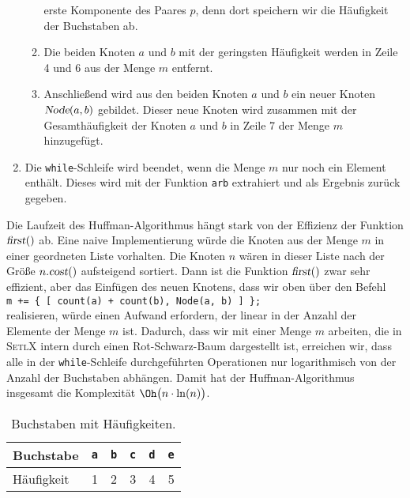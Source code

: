 \begin{enumerate}
\begin{enumerate}
            erste Komponente des Paares $p$, denn dort speichern wir die H\"aufigkeit der Buchstaben 
            ab.
      \item Die beiden Knoten $a$ und $b$ mit der geringsten H\"aufigkeit werden in Zeile 4 und 6
            aus der Menge $m$ entfernt.
      \item Anschlie{\ss}end wird aus den beiden Knoten $a$ und $b$ ein neuer Knoten 
            $\textsl{Node}(a,b)$ gebildet.
            Dieser neue Knoten wird zusammen mit der Gesamth\"aufigkeit der Knoten $a$ und $b$ in Zeile
            7 der Menge $m$ hinzugef\"ugt.
      \end{enumerate}
\item Die \texttt{while}-Schleife wird beendet, wenn die Menge $m$ nur noch ein Element enth\"alt.
      Dieses wird mit der Funktion \texttt{arb} extrahiert und als Ergebnis zur\"uck gegeben.
\end{enumerate}
Die Laufzeit des Huffman-Algorithmus h\"angt stark von der Effizienz der Funktion $\textsl{first}()$ ab.
Eine naive Implementierung w\"urde die Knoten aus der Menge $m$ in einer geordneten Liste vorhalten.
Die Knoten $n$ w\"aren in dieser Liste nach der Gr\"o{\ss}e $n.\textsl{cost}()$ aufsteigend sortiert.
Dann ist die Funktion $\textsl{first}()$ zwar sehr effizient, aber das Einf\"ugen des neuen Knotens,
dass wir oben \"uber den Befehl 
\\[0.2cm]
\hspace*{1.3cm}
\texttt{m += \{ [ count(a) + count(b), Node(a, b) ] \};}
\\[0.2cm]
realisieren,  w\"urde einen Aufwand erfordern, der linear in der Anzahl der Elemente der Menge $m$ ist.
Dadurch, dass wir mit einer Menge  $m$ arbeiten, die in \textsc{SetlX} intern durch einen
Rot-Schwarz-Baum dargestellt ist, erreichen wir, dass alle in der \texttt{while}-Schleife durchgef\"uhrten
Operationen nur logarithmisch von der Anzahl der Buchstaben abh\"angen.  Damit hat der Huffman-Algorithmus
insgesamt die Komplexit\"at $\Oh\bigl(n \cdot \ln(n)\bigr)$.
 

\begin{table}[htbp]
  \centering
\begin{tabular}[t]{|l|r|r|r|r|r|}
\hline
Buchstabe  & \texttt{a} & \texttt{b} & \texttt{c} & \texttt{d} & \texttt{e} \\
\hline
H\"aufigkeit &          1 &          2 &          3 &          4 &          5 \\
\hline
\end{tabular}
  \caption{Buchstaben mit H\"aufigkeiten.}
  \label{tab:frequency}
\end{table}

